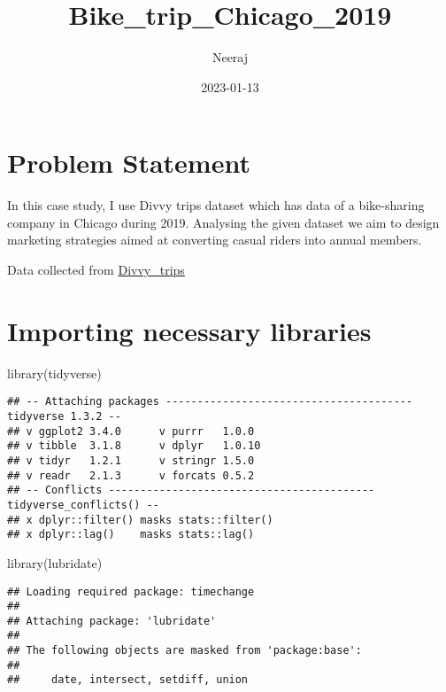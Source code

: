 \documentclass[
]{article}
\title{Bike\_trip\_Chicago\_2019}
\author{Neeraj}
\date{2023-01-13}
\newenvironment{Shaded}{\begin{snugshade}}{\end{snugshade}}
\newcommand{\FunctionTok}[1]{\textcolor[rgb]{0.00,0.00,0.00}{#1}}
\newcommand{\NormalTok}[1]{#1}
\begin{document}
\maketitle

\hypertarget{problem-statement}{%
\section{Problem Statement}\label{problem-statement}}

In this case study, I use Divvy trips dataset which has data of a
bike-sharing company in Chicago during 2019. Analysing the given dataset
we aim to design marketing strategies aimed at converting casual riders
into annual members.

Data collected from
\href{https://divvy-tripdata.s3.amazonaws.com/index.html}{Divvy\_trips}

\hypertarget{importing-necessary-libraries}{%
\section{Importing necessary
libraries}\label{importing-necessary-libraries}}

\begin{Shaded}
\begin{Highlighting}[]
\FunctionTok{library}\NormalTok{(tidyverse)}
\end{Highlighting}
\end{Shaded}

\begin{verbatim}
## -- Attaching packages --------------------------------------- tidyverse 1.3.2 --
## v ggplot2 3.4.0      v purrr   1.0.0 
## v tibble  3.1.8      v dplyr   1.0.10
## v tidyr   1.2.1      v stringr 1.5.0 
## v readr   2.1.3      v forcats 0.5.2 
## -- Conflicts ------------------------------------------ tidyverse_conflicts() --
## x dplyr::filter() masks stats::filter()
## x dplyr::lag()    masks stats::lag()
\end{verbatim}

\begin{Shaded}
\begin{Highlighting}[]
\FunctionTok{library}\NormalTok{(lubridate)}
\end{Highlighting}
\end{Shaded}

\begin{verbatim}
## Loading required package: timechange
## 
## Attaching package: 'lubridate'
## 
## The following objects are masked from 'package:base':
## 
##     date, intersect, setdiff, union
\end{verbatim}
\end{document}
